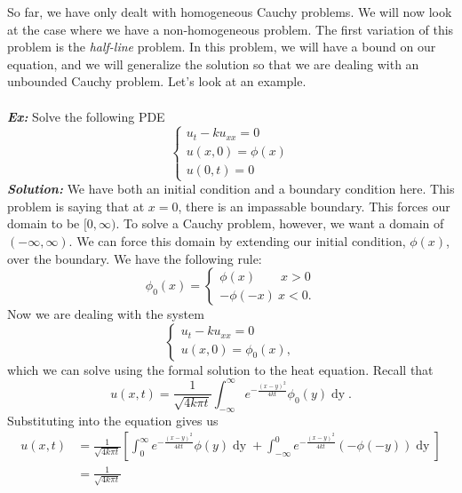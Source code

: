 \newpage
\indent So far, we have only dealt with homogeneous Cauchy problems. We will now look at the case where we have a non-homogeneous problem. The first variation of this problem is the \textit{half-line} problem. In this problem, we will have a bound on our equation, and we will generalize the solution so that we are dealing with an unbounded Cauchy problem. Let's look at an example.
\noindent\\\\ \textbf{\textit{Ex:}} Solve the following PDE
\[
\begin{cases}
u_{t} - ku_{xx} = 0\\
u(x,0) = \phi(x)\\
u(0,t) = 0
\end{cases}
\]
\indent \textbf{\textit{Solution:}} We have both an initial condition and a boundary condition here. This problem is saying that at $x=0$, there is an impassable boundary. This forces our domain to be $[0,\infty)$. To solve a Cauchy problem, however, we want a domain of $(-\infty,\infty)$. We can force this domain by extending our initial condition, $\phi(x)$, over the boundary. We have the following rule:
\[
\phi_{0}(x) =
\begin{cases}
\phi(x)\quad\quad x>0\\
-\phi(-x)\ x<0.
\end{cases}
\]
Now we are dealing with the system
\[
\begin{cases}
u_{t} - ku_{xx} = 0\\
u(x,0) = \phi_{0}(x),
\end{cases}
\]
which we can solve using the formal solution to the heat equation. Recall that
\[
u(x,t) = \frac{1}{\sqrt{4k\pi t}}\int_{-\infty}^{\infty}e^{-\frac{(x-y)^{2}}{4kt}}\phi_{0}(y)\mathop{dy}.
\]
Substituting into the equation gives us
\begin{align*}
u(x,t) &= \frac{1}{\sqrt{4k\pi t}}\left[\int_{0}^{\infty}e^{-\frac{(x-y)^{2}}{4kt}}\phi(y)\mathop{dy} + \int_{-\infty}^{0}e^{-\frac{(x-y)^{2}}{4kt}}(-\phi(-y))\mathop{dy} \right]\\
&= \frac{1}{\sqrt{4k\pi t}}
\end{align*}
